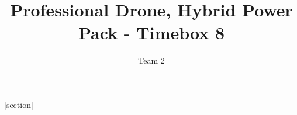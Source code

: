 

\title{Professional Drone, Hybrid Power Pack  - Timebox 8}
\author{Team 2}






[section]\setcounter{udrboks}{0}
\renewcommand{\theudrboks}{\arabic{section}.\arabic{udrboks}}
\renewcommand{\theudrboks}{\arabic{udrboks}}
\newenvironment{udrboks}[2][]{%
  \refstepcounter{udrboks}%
  \ifstrempty{#1}%
  {\mdfsetup{%
      frametitle={%
        \tikz[baseline=(current bounding box.east),outer sep=0pt]
        \node[anchor=east,rectangle,fill=blue!20]
        {\strut Udregninger~\theudrboks};}}
  }%
  {\mdfsetup{%
      frametitle={%
        \tikz[baseline=(current bounding box.east),outer sep=0pt]
        \node[anchor=east,rectangle,fill=blue!20]
        {\strut Udregninger ~\theudrboks:~#1};}}%
  }%
  \mdfsetup{innertopmargin=10pt,linecolor=blue!20,%
    linewidth=2pt,topline=true,%
    frametitleaboveskip=\dimexpr-\ht\strutbox\relax
  }
  \begin{mdframed}[]\relax%
    \label{#2}}{\end{mdframed}}


